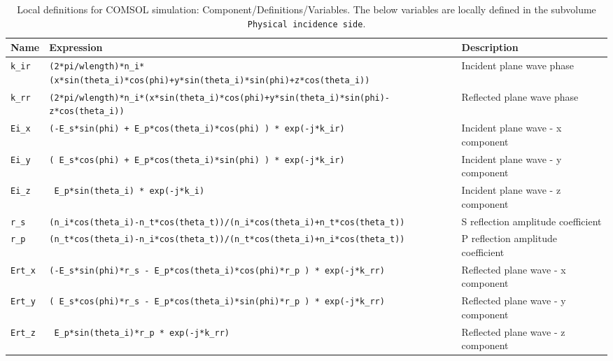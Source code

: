 \begin{sidewaystable}
 \caption{Local definitions for COMSOL simulation: Component/Definitions/Variables. The below variables are locally defined in the subvolume \lstinline!Physical incidence side!. }
 \label{tab:Incident-parameters}
    \centering
    \footnotesize
    \begin{tabular*}{.94\textwidth}{ |l|l|l| }
     \hline
     \textbf{Name}      &   \textbf{Expression}                                                                                 &   \textbf{Description} \\ \hline \hline
     \lstinline!k_ir!   &    \lstinline!(2*pi/wlength)*n_i*(x*sin(theta_i)*cos(phi)+y*sin(theta_i)*sin(phi)+z*cos(theta_i))!     &   Incident plane wave phase          \\
     \lstinline!k_rr!   &    \lstinline!(2*pi/wlength)*n_i*(x*sin(theta_i)*cos(phi)+y*sin(theta_i)*sin(phi)-z*cos(theta_i))!     &   Reflected plane wave phase         \\
     \lstinline!Ei_x!   &   \lstinline!(-E_s*sin(phi) + E_p*cos(theta_i)*cos(phi) ) * exp(-j*k_ir)!                              &   Incident plane wave - x component  \\
     \lstinline!Ei_y!   &   \lstinline!( E_s*cos(phi) + E_p*cos(theta_i)*sin(phi) ) * exp(-j*k_ir)!                              &   Incident plane wave - y component  \\
     \lstinline!Ei_z!   &   \lstinline! E_p*sin(theta_i) * exp(-j*k_i)!                                                         &   Incident  plane wave - z component \\
     \lstinline!r_s!    &   \lstinline!(n_i*cos(theta_i)-n_t*cos(theta_t))/(n_i*cos(theta_i)+n_t*cos(theta_t))!                 &   S reflection amplitude coefficient \\
     \lstinline!r_p!    &   \lstinline!(n_t*cos(theta_i)-n_i*cos(theta_t))/(n_t*cos(theta_i)+n_i*cos(theta_t))!                 &   P reflection amplitude coefficient \\
     \lstinline!Ert_x!  &   \lstinline!(-E_s*sin(phi)*r_s - E_p*cos(theta_i)*cos(phi)*r_p ) * exp(-j*k_rr)!                      &   Reflected plane wave - x component \\
     \lstinline!Ert_y!  &   \lstinline!( E_s*cos(phi)*r_s - E_p*cos(theta_i)*sin(phi)*r_p ) * exp(-j*k_rr)!                      &   Reflected plane wave - y component \\
     \lstinline!Ert_z!  &   \lstinline! E_p*sin(theta_i)*r_p * exp(-j*k_rr)!                                                     &   Reflected plane wave - z component \\

\end{tabular*}
\end{sidewaystable}
